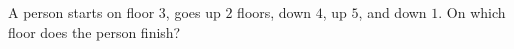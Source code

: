 A person starts on floor $3$, goes up $2$ floors, down $4$, up $5$, and down $1$. On which floor does the person finish?
